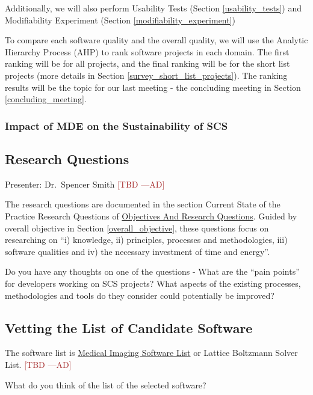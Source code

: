 \documentclass[12pt]{article}
\newcommand{\authornote}[3]{\textcolor{#1}{[#3 ---#2]}}
\newcommand{\authornote}[3]{}
\newcommand{\ad}[1]{\authornote{brown}{AD}{#1}} %
\begin{document}
Additionally, we will also perform Usability Tests (Section
\ref{usability_tests}) and Modifiability Experiment (Section
\ref{modifiability_experiment})

To compare each software quality and the overall quality, we will use the
Analytic Hierarchy Process (AHP) to rank software projects in each domain. The
first ranking will be for all projects, and the final ranking will be for the
short list projects (more details in Section \ref{survey_short_list_projects}).
The ranking results will be the topic for our last meeting - the concluding
meeting in Section \ref{concluding_meeting}.

\subsubsection{Impact of MDE on the Sustainability of SCS}

\subsection{Research Questions}
\label{research_questions}
Presenter: Dr.\ Spencer Smith \ad{TBD}

The research questions are documented in the section Current State of the
Practice Research Questions of
\href{https://github.com/smiths/AIMSS/blob/master/OverallResearchProposal/ObjectivesAndResearchQuestions.pdf}{Objectives
And Research Questions}. Guided by overall objective in Section
\ref{overall_objective}, these questions focus on researching on ``i) knowledge,
ii) principles, processes
and methodologies, iii) software qualities and iv) the necessary investment of
time and energy''.

Do you have any thoughts on one of the questions - What are the ``pain points''
for developers working on SCS projects? What aspects of the existing processes,
methodologies and tools do they consider could potentially be improved?

\subsection{Vetting the List of Candidate Software}
\label{software_list}

The software list is
\href{https://docs.google.com/spreadsheets/d/122wU0v3ZtvDcqy8C4zKJ89kU-8fXAbo3Mzn6vcVXOi0/edit?usp=sharing}{Medical
	Imaging Software List} or Lattice Boltzmann Solver List. \ad{TBD}

What do you think of the list of the selected software?
\end{document}
